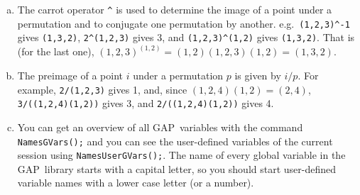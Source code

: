 \documentclass[11pt]{amsart}
\newcommand{\gap}{GAP}   %
\theoremstyle{plain}
\newcommand{\<}{\ensuremath{\langle}}
\renewcommand{\>}{\ensuremath{\rangle}}
\begin{document}
\begin{enumerate}[a.]
\item
The carrot operator \verb|^| is used to determine the image of a point under a
permutation and to conjugate one permutation by another. 
e.g.~\verb|(1,2,3)^-1| gives \verb|(1,3,2)|, \verb|2^(1,2,3)| gives 3, and
\verb|(1,2,3)^(1,2)| gives \verb|(1,3,2)|.
That is (for the last one), $(1,2,3)^{(1,2)} = (1,2)(1,2,3)(1,2) = (1,3,2)$.
\item
The preimage of a point $i$ under a permutation $p$ is given by $i/p$.  For example,
\verb|2/(1,2,3)| gives 1, and, since $(1,2,4)(1,2) = (2,4)$,
\verb|3/((1,2,4)(1,2))| gives 3, and \verb|2/((1,2,4)(1,2))| gives 4.
\item 
You can get an overview of all \gap\ variables with the command {\tt NamesGVars();} and
you can see the user-defined variables of the current session using 
{\tt NamesUserGVars();}.
The name of every global variable in the \gap\ library starts with a capital letter, so you
should start user-defined variable names with a lower case letter (or a number).
\end{enumerate}

\newpage 
\end{document}
